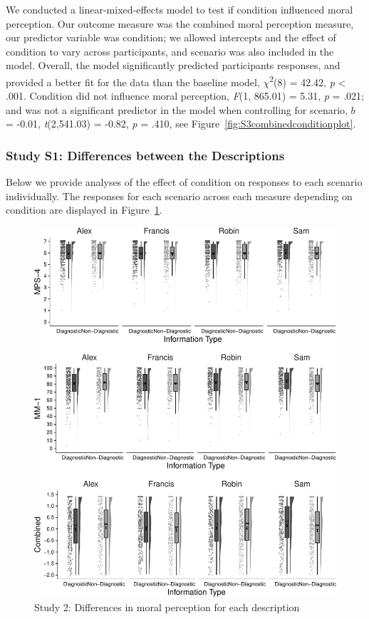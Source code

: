 \documentclass[
  man,floatsintext]{apa6}
\begin{document}
We conducted a linear-mixed-effects model to test if condition influenced moral perception. Our outcome measure was the combined moral perception measure, our predictor variable was condition; we allowed intercepts and the effect of condition to vary across participants, and scenario was also included in the model.
Overall, the model significantly predicted participants responses, and provided a better fit for the data than the baseline model, \(\chi\)\textsuperscript{2}(8) = 42.42, \emph{p} \textless{} .001. Condition did not influence moral perception, \emph{F}(1, 865.01) = 5.31, \emph{p} = .021; and was not a significant predictor in the model when controlling for scenario, \(b\) = -0.01, \emph{t}(2,541.03) = -0.82, \emph{p} = .410, see Figure~\ref{fig:S3combinedconditionplot}.

\subsubsection{Study S1: Differences between the Descriptions}\label{study-s1-differences-between-the-descriptions}

Below we provide analyses of the effect of condition on responses to each scenario individually. The responses for each scenario across each measure depending on condition are displayed in Figure~\ref{fig:Supp1AllscenariosPlot}.

\begin{figure}[!h]
\includegraphics[width=\textwidth,]{Supplementary_files/figure-latex/Supp1AllscenariosPlot-1} \caption{Study 2: Differences in moral perception for each description}\label{fig:Supp1AllscenariosPlot}
\end{figure}
\end{document}

